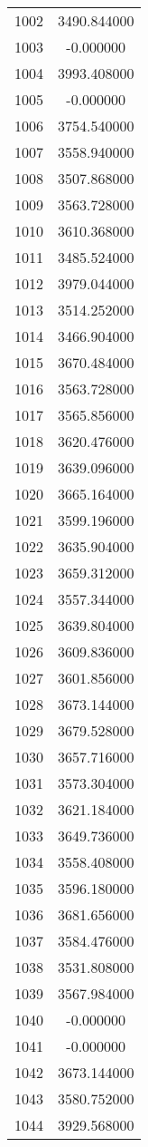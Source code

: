 \documentclass[12pt]{article}
\begin{document}
\begin{longtable}{@{}cc@{}}
1002 & 3490.844000 \\
1003 & -0.000000 \\
1004 & 3993.408000 \\
1005 & -0.000000 \\
1006 & 3754.540000 \\
1007 & 3558.940000 \\
1008 & 3507.868000 \\
1009 & 3563.728000 \\
1010 & 3610.368000 \\
1011 & 3485.524000 \\
1012 & 3979.044000 \\
1013 & 3514.252000 \\
1014 & 3466.904000 \\
1015 & 3670.484000 \\
1016 & 3563.728000 \\
1017 & 3565.856000 \\
1018 & 3620.476000 \\
1019 & 3639.096000 \\
1020 & 3665.164000 \\
1021 & 3599.196000 \\
1022 & 3635.904000 \\
1023 & 3659.312000 \\
1024 & 3557.344000 \\
1025 & 3639.804000 \\
1026 & 3609.836000 \\
1027 & 3601.856000 \\
1028 & 3673.144000 \\
1029 & 3679.528000 \\
1030 & 3657.716000 \\
1031 & 3573.304000 \\
1032 & 3621.184000 \\
1033 & 3649.736000 \\
1034 & 3558.408000 \\
1035 & 3596.180000 \\
1036 & 3681.656000 \\
1037 & 3584.476000 \\
1038 & 3531.808000 \\
1039 & 3567.984000 \\
1040 & -0.000000 \\
1041 & -0.000000 \\
1042 & 3673.144000 \\
1043 & 3580.752000 \\
1044 & 3929.568000 \\

\end{longtable}
\end{document}

